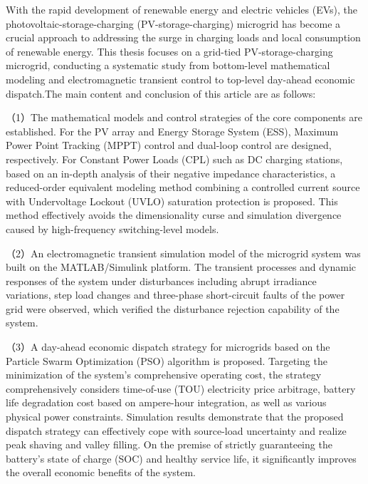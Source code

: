 \begin{enabstract}
With the rapid development of renewable energy and electric vehicles (EVs), the photovoltaic-storage-charging (PV-storage-charging) microgrid has become a crucial approach to addressing the surge in charging loads and local consumption of renewable energy. This thesis focuses on a grid-tied PV-storage-charging microgrid, conducting a systematic study from bottom-level mathematical modeling and electromagnetic transient control to top-level day-ahead economic dispatch.The main content and conclusion of this article are as follows:

（1）The mathematical models and control strategies of the core components are established. For the PV array and Energy Storage System (ESS), Maximum Power Point Tracking (MPPT) control and dual-loop control are designed, respectively. For Constant Power Loads (CPL) such as DC charging stations, based on an in-depth analysis of their negative impedance characteristics, a reduced-order equivalent modeling method combining a controlled current source with Undervoltage Lockout (UVLO) saturation protection is proposed. This method effectively avoids the dimensionality curse and simulation divergence caused by high-frequency switching-level models.

（2）An electromagnetic transient simulation model of the microgrid system was built on the MATLAB/Simulink platform. The transient processes and dynamic responses of the system under disturbances including abrupt irradiance variations, step load changes and three-phase short-circuit faults of the power grid were observed, which verified the disturbance rejection capability of the system.

（3）A day-ahead economic dispatch strategy for microgrids based on the Particle Swarm Optimization (PSO) algorithm is proposed. Targeting the minimization of the system’s comprehensive operating cost, the strategy comprehensively considers time-of-use (TOU) electricity price arbitrage, battery life degradation cost based on ampere-hour integration, as well as various physical power constraints. Simulation results demonstrate that the proposed dispatch strategy can effectively cope with source-load uncertainty and realize peak shaving and valley filling. On the premise of strictly guaranteeing the battery’s state of charge (SOC) and healthy service life, it significantly improves the overall economic benefits of the system.

\end{enabstract}
